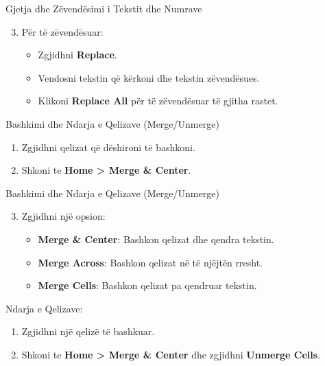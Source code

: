\documentclass[
  ignorenonframetext,
]{beamer}
\begin{document}
\begin{frame}{Gjetja dhe Zëvendësimi i Tekstit dhe Numrave}
\label{gjetja-dhe-zuxebvenduxebsimi-i-tekstit-dhe-numrave-1}
\begin{enumerate}
\setcounter{enumi}{2}
\item
  Për të zëvendësuar:

  \begin{itemize}
  \item
    Zgjidhni \textbf{Replace}.
  \item
    Vendosni tekstin që kërkoni dhe tekstin zëvendësues.
  \item
    Klikoni \textbf{Replace All} për të zëvendësuar të gjitha rastet.
  \end{itemize}
\end{enumerate}
\end{frame}

\begin{frame}{Bashkimi dhe Ndarja e Qelizave (Merge/Unmerge)}
\label{bashkimi-dhe-ndarja-e-qelizave-mergeunmerge}
\begin{enumerate}
\item
  Zgjidhni qelizat që dëshironi të bashkoni.
\item
  Shkoni te \textbf{Home \textgreater{} Merge \& Center}.
\end{enumerate}
\end{frame}

\begin{frame}{Bashkimi dhe Ndarja e Qelizave (Merge/Unmerge)}
\label{bashkimi-dhe-ndarja-e-qelizave-mergeunmerge-1}
\begin{enumerate}
\setcounter{enumi}{2}
\item
  Zgjidhni një opsion:

  \begin{itemize}
  \item
    \textbf{Merge \& Center}: Bashkon qelizat dhe qendra tekstin.
  \item
    \textbf{Merge Across}: Bashkon qelizat në të njëjtën rresht.
  \item
    \textbf{Merge Cells}: Bashkon qelizat pa qendruar tekstin.
  \end{itemize}
\end{enumerate}
\end{frame}

\begin{frame}{Ndarja e Qelizave:}
\label{ndarja-e-qelizave}
\begin{enumerate}
\item
  Zgjidhni një qelizë të bashkuar.
\item
  Shkoni te \textbf{Home \textgreater{} Merge \& Center} dhe zgjidhni
  \textbf{Unmerge Cells}.
\end{enumerate}
\end{frame}
\end{document}
